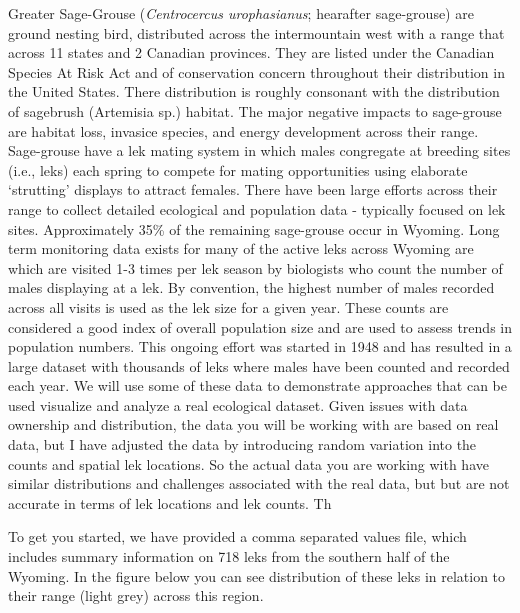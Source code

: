\documentclass[
]{book}
\begin{document}
Greater Sage-Grouse (\emph{Centrocercus urophasianus}; hearafter sage-grouse) are ground nesting bird, distributed across the intermountain west with a range that across 11 states and 2 Canadian provinces. They are listed under the Canadian Species At Risk Act and of conservation concern throughout their distribution in the United States. There distribution is roughly consonant with the distribution of sagebrush (Artemisia sp.) habitat. The major negative impacts to sage-grouse are habitat loss, invasice species, and energy development across their range. Sage-grouse have a lek mating system in which males congregate at breeding sites (i.e., leks) each spring to compete for mating opportunities using elaborate `strutting' displays to attract females. There have been large efforts across their range to collect detailed ecological and population data - typically focused on lek sites. Approximately 35\% of the remaining sage-grouse occur in Wyoming. Long term monitoring data exists for many of the active leks across Wyoming are which are visited 1-3 times per lek season by biologists who count the number of males displaying at a lek. By convention, the highest number of males recorded across all visits is used as the lek size for a given year. These counts are considered a good index of overall population size and are used to assess trends in population numbers. This ongoing effort was started in 1948 and has resulted in a large dataset with thousands of leks where males have been counted and recorded each year. We will use some of these data to demonstrate approaches that can be used visualize and analyze a real ecological dataset. Given issues with data ownership and distribution, the data you will be working with are based on real data, but I have adjusted the data by introducing random variation into the counts and spatial lek locations. So the actual data you are working with have similar distributions and challenges associated with the real data, but but are not accurate in terms of lek locations and lek counts. Th

To get you started, we have provided a comma separated values file, which includes summary information on 718 leks from the southern half of the Wyoming. In the figure below you can see distribution of these leks in relation to their range (light grey) across this region.
\end{document}
